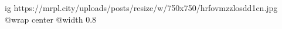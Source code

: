  
 
 
 
 

\ifcmt
  ig https://mrpl.city/uploads/posts/resize/w/750x750/hrfovmzzlosdd1cn.jpg
  @wrap center
  @width 0.8
\fi
